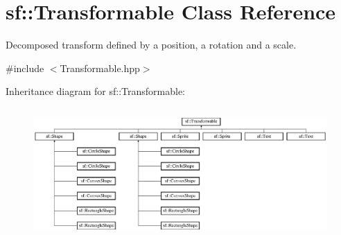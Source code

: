 \hypertarget{classsf_1_1_transformable}{\section{sf\-:\-:Transformable Class Reference}
\label{classsf_1_1_transformable}
}


Decomposed transform defined by a position, a rotation and a scale.  




{\ttfamily \#include $<$Transformable.\-hpp$>$}

Inheritance diagram for sf\-:\-:Transformable\-:\begin{figure}[H]
\begin{center}
\leavevmode
\includegraphics[height=5.000000cm]{classsf_1_1_transformable}
\end{center}
\end{figure}
